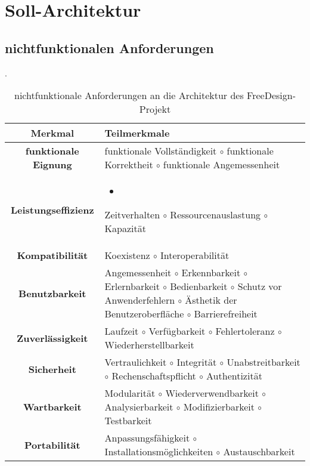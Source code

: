 \section{Soll-Architektur}



\subsection{nichtfunktionalen Anforderungen}
\begin{table}[H]
    \centering
    \caption{nichtfunktionale Anforderungen an die Architektur des FreeDesign-Projekt}. 
    \label{table:nfqa}
    \begin{tabularx}{\columnwidth}{c|X}
    \textbf{Merkmal} & \textbf{Teilmerkmale} \\
    \hline
    \hline
    \textbf{funktionale Eignung} & 
        funktionale Vollständigkeit {$\circ$} funktionale Korrektheit {$\circ$} funktionale Angemessenheit 
    \\
    \hline
    \textbf{Leistungseffizienz}  & 
        \begin{itemize}
            \item 
        \end{itemize}
        Zeitverhalten {$\circ$} Ressourcenauslastung {$\circ$} Kapazität
    \\
    \hline
    \textbf{Kompatibilität}  & 
        Koexistenz {$\circ$} Interoperabilität
    \\
    \hline
    \textbf{Benutzbarkeit}  & 
        Angemessenheit {$\circ$} Erkennbarkeit {$\circ$} Erlernbarkeit {$\circ$} Bedienbarkeit {$\circ$} Schutz vor Anwenderfehlern {$\circ$} Ästhetik der Benutzeroberfläche {$\circ$} Barrierefreiheit
    \\
    \hline
    \textbf{Zuverlässigkeit}  & 
        Laufzeit {$\circ$} Verfügbarkeit {$\circ$} Fehlertoleranz {$\circ$} Wiederherstellbarkeit
    \\
    \hline
    \textbf{Sicherheit}  & 
        Vertraulichkeit {$\circ$} Integrität {$\circ$} Unabstreitbarkeit {$\circ$} Rechenschaftspflicht {$\circ$} Authentizität 
    \\
    \hline
    \textbf{Wartbarkeit}  & 
        Modularität {$\circ$} Wiederverwendbarkeit {$\circ$} Analysierbarkeit {$\circ$} Modifizierbarkeit {$\circ$} Testbarkeit
    \\
    \hline
    \textbf{Portabilität} & 
        Anpassungsfähigkeit {$\circ$} Installationsmöglichkeiten {$\circ$} \newline Austauschbarkeit
\end{tabularx}
\end{table}


